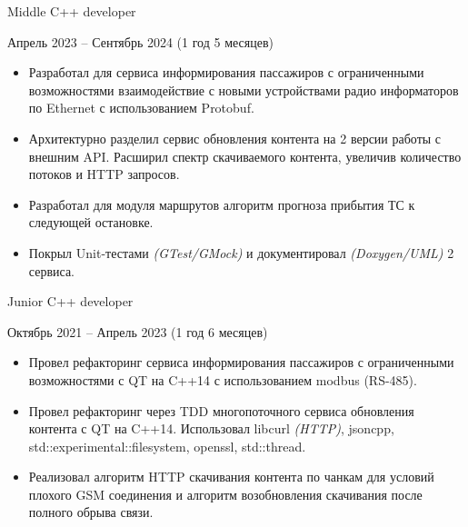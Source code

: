 {    \cvexperiencePosition
        {Middle C++ developer}

    \cvexperiencePeriod
        {Апрель 2023 -- Сентябрь 2024 (1 год 5 месяцев)}

    \smallskip
    \begin{itemize}

        \item
            Разработал для сервиса информирования пассажиров с ограниченными возможностями
            взаимодействие с новыми устройствами радио информаторов по Ethernet с использованием
            Protobuf.

        \item
            Архитектурно разделил сервис обновления контента на 2 версии работы с внешним API.
            Расширил спектр скачиваемого контента, увеличив количество потоков и HTTP запросов.

        \item
            Разработал для модуля маршрутов алгоритм прогноза прибытия ТС к следующей остановке.

        \item
            Покрыл Unit-тестами \textit{(GTest/GMock)} и документировал \textit{(Doxygen/UML)}
            2 сервиса.

    \end{itemize}


    \cvexperiencePosition
        {Junior C++ developer}

    \cvexperiencePeriod
        {Октябрь 2021 -- Апрель 2023 (1 год 6 месяцев)}

    \smallskip
    \begin{itemize}

        \item
            Провел рефакторинг сервиса информирования пассажиров с ограниченными возможностями
            с QT на C++14 с использованием modbus (RS-485).

        \item
            Провел рефакторинг через TDD многопоточного сервиса обновления контента с QT на C++14.
            Использовал libcurl \textit{(HTTP)}, jsoncpp, std::experimental::filesystem, openssl,
            std::thread.

        \item
            Реализовал алгоритм HTTP скачивания контента по чанкам для условий плохого GSM
            соединения и алгоритм возобновления скачивания после полного обрыва связи.


\end{itemize}}
